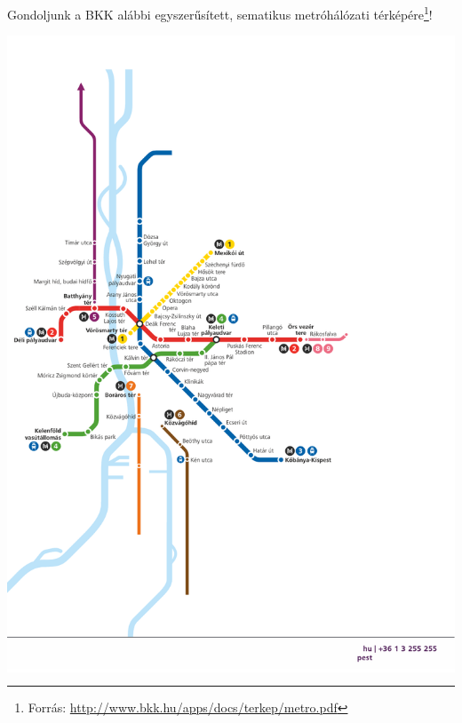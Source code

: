 \begin{megjegyzes}
	Gondoljunk a BKK alábbi egyszerűsített, sematikus metróhálózati térképére\footnote{Forrás: \url{http://www.bkk.hu/apps/docs/terkep/metro.pdf}}!
	\begin{center}
		\colorbox{white}{
			\includegraphics[scale=0.7]{modellek-ellenorzese/figures/metrohev-terkep-reszlet}
		}
	\end{center}
	

\end{megjegyzes}
